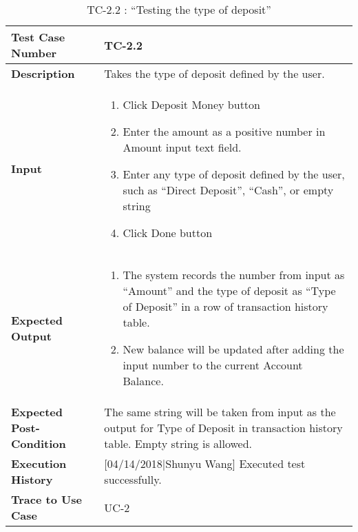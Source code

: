 \documentclass[12pt]{article}
\begin{document}
\begin{table}[H]
\caption{TC-2.2 : “Testing the type of deposit”}
\begin{center}
\begin{tabular}{|p{5	cm}|p{12cm}|}
\hline
\bf Test Case Number & 
TC-2.2 \\
\hline
\bf Description & 
Takes the type of deposit defined by the user.\\
\hline
\bf Input & 
\begin{enumerate}
  \item Click Deposit Money button
  \item Enter the amount as a positive number in Amount input text field.
  \item Enter any type of deposit defined by the user, such as “Direct Deposit”, “Cash”, or empty string
  \item Click Done button
\end{enumerate} \\
\hline
\bf Expected Output & 
\begin{enumerate}
  \item The system records the number from input as “Amount” and the type of deposit as “Type of Deposit” in a row of transaction history table.
  \item New balance will be updated after adding the input number to the current Account Balance.
\end{enumerate} \\
\hline
\bf Expected Post-Condition & 
The same string will be taken from input as the output for Type of Deposit in transaction history table. Empty string is allowed.\\
\hline
\bf Execution History & 
[04/14/2018|Shunyu Wang] Executed test successfully.\\
\hline
\bf Trace to Use Case & 
UC-2\\
\hline

\end{tabular}
\end{center}
\end{table}
\end{document}
